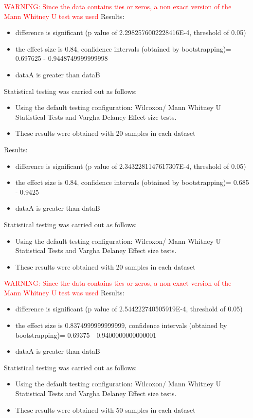 \documentclass[]{article}
\begin{document}
\textcolor{Red}{WARNING: Since the data contains ties or zeros, a non exact version of the Mann Whitney U test was used
}
Results:
\begin{itemize}
\item{difference is significant (p value of 2.2982576002228416E-4, threshold of 0.05)}
\item{the effect size is 0.84, confidence intervals (obtained by bootstrapping)= 0.697625 - 0.9448749999999998}
\item{dataA is greater than dataB}
\end{itemize}Statistical testing was carried out as follows: \begin{itemize}
\item{Using the default testing configuration: Wilcoxon/ Mann Whitney U Statistical Tests and Vargha Delaney Effect size tests.}
\item{These results were obtained with 20 samples in each dataset}
\end{itemize}Results:
\begin{itemize}
\item{difference is significant (p value of 2.3432281147617307E-4, threshold of 0.05)}
\item{the effect size is 0.84, confidence intervals (obtained by bootstrapping)= 0.685 - 0.9425}
\item{dataA is greater than dataB}
\end{itemize}Statistical testing was carried out as follows: \begin{itemize}
\item{Using the default testing configuration: Wilcoxon/ Mann Whitney U Statistical Tests and Vargha Delaney Effect size tests.}
\item{These results were obtained with 20 samples in each dataset}
\end{itemize}
\textcolor{Red}{WARNING: Since the data contains ties or zeros, a non exact version of the Mann Whitney U test was used
}
Results:
\begin{itemize}
\item{difference is significant (p value of 2.544222740505919E-4, threshold of 0.05)}
\item{the effect size is 0.8374999999999999, confidence intervals (obtained by bootstrapping)= 0.69375 - 0.9400000000000001}
\item{dataA is greater than dataB}
\end{itemize}Statistical testing was carried out as follows: \begin{itemize}
\item{Using the default testing configuration: Wilcoxon/ Mann Whitney U Statistical Tests and Vargha Delaney Effect size tests.}
\item{These results were obtained with 50 samples in each dataset}
\end{itemize}
\end{document}
